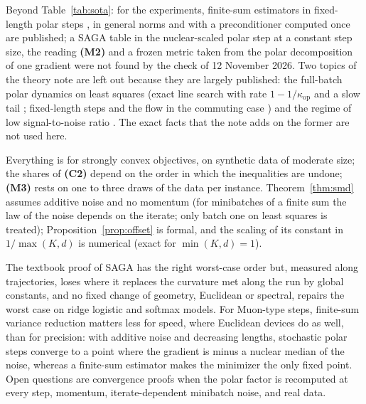 \documentclass[10pt]{article}
\makeatletter
\renewcommand\subsection{\@startsection{subsection}{2}{\z@}{-1.8ex\@plus -0.5ex \@minus -.2ex}{0.8ex \@plus .2ex}{\normalfont\normalsize\bfseries}}
\newcommand{\kop}{\kappa_{\mathrm{op}}}
\newcommand{\finding}[1]{\textbf{(#1)}}
\makeatother
\begin{document}
Beyond Table~\ref{tab:sota}: for the experiments, finite-sum
estimators in fixed-length polar steps \cite{li2026implicit}, in general norms \cite{allenzhu2018katyusha} and with a
preconditioner computed once \cite{yang2014data} are published; a SAGA table in the nuclear-scaled polar step at a
constant step size, the reading \finding{M2} and a frozen metric taken from the polar decomposition of one gradient
were not found by the check of 12 November 2026. Two topics of the theory note are left out because they are largely
published: the full-batch polar dynamics on least squares (exact line search with rate $1-1/\kop$ and a slow tail
\cite{shulgin2026quadratic}; fixed-length steps and the flow in the commuting case \cite{vasudeva2025muon}) and the
regime of low signal-to-noise ratio \cite{xie2026muon,chen2026when,paquette2026phases}. The exact facts that the note adds on the
former are not used here.

\subsection{Limitations}

Everything is for strongly convex objectives, on synthetic data of moderate size; the shares of \finding{C2} depend on
the order in which the inequalities are undone; \finding{M3} rests on one to three draws of the data per instance.
Theorem~\ref{thm:smd} assumes additive noise and no momentum (for minibatches of a finite sum the law of the noise
depends on the iterate; only batch one on least squares is treated); Proposition~\ref{prop:offset} is formal, and the
scaling of its constant in $1/\max(K,d)$ is numerical (exact for $\min(K,d)=1$).

\subsection{Conclusion}

The textbook proof of SAGA has the right worst-case order but, measured along trajectories, loses where it replaces
the curvature met along the run by global constants, and no fixed change of geometry, Euclidean or spectral, repairs
the worst case on ridge logistic and softmax models. For Muon-type steps, finite-sum variance reduction matters less
for speed, where Euclidean devices do as well, than for precision: with additive noise and decreasing lengths,
stochastic polar steps converge to a point where the gradient is minus a nuclear median of the noise, whereas a
finite-sum estimator makes the minimizer the only fixed point. Open questions are convergence proofs when the polar factor is recomputed at every step, momentum,
iterate-dependent minibatch noise, and real data.
\end{document}
